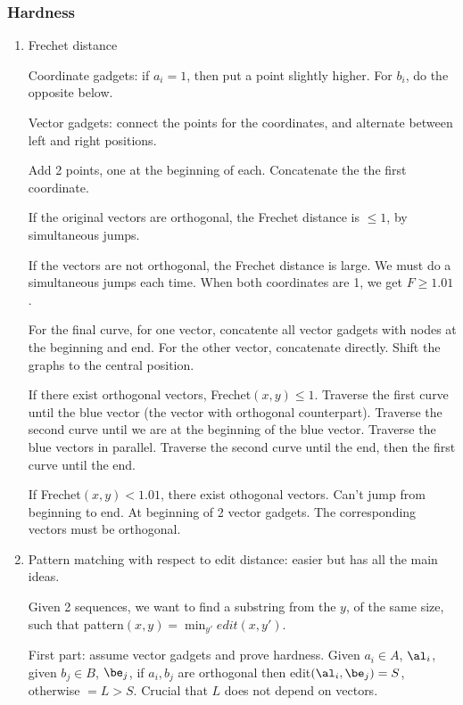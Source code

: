 \subsubsection{Hardness}
\begin{enumerate}
\item
Frechet distance

Coordinate gadgets: if $a_i=1$, then put a point slightly higher. For $b_i$, do the opposite below.

Vector gadgets: %
connect the points for the coordinates, and alternate between left and right positions.

Add 2 points, one at the beginning of each. Concatenate the the first coordinate. 

If the original vectors are orthogonal, the Frechet distance is $\le 1$, by simultaneous jumps.

If the vectors are not orthogonal, the Frechet distance is large. We must do a simultaneous jumps each time. When both coordinates are 1, we get $F\ge 1.01$.

For the final curve, for one vector, concatente all vector gadgets with nodes at the beginning and end. For the other vector, concatenate directly. 
Shift the graphs to the central position.

If there exist orthogonal vectors, Frechet$(x,y)\le 1$. 
Traverse the first curve until the blue vector (the vector with orthogonal counterpart). %
Traverse the second curve until we are at the beginning of the blue vector.
Traverse the blue vectors in parallel. Traverse the second curve until the end, then the first curve until the end.

If Frechet$(x,y)<1.01$, there exist othogonal vectors. Can't jump from beginning to end. At beginning of 2 vector gadgets. The corresponding vectors must be orthogonal.
\item 
Pattern matching with respect to edit distance: easier but has all the main ideas.

Given 2 sequences, we want to find a substring from the $y$, of the same size, such that 
pattern$(x,y)= \min_{y'}edit(x,y')$.

First part: assume vector gadgets and prove hardness. Given $a_i\in A$, $\al_i$, given $b_j\in B$, $\be_j$, if $a_i,b_j$ are orthogonal then edit$(\al_i,\be_j)=S$, otherwise $=L>S$. Crucial that $L$ does not depend on vectors.


\end{enumerate}
